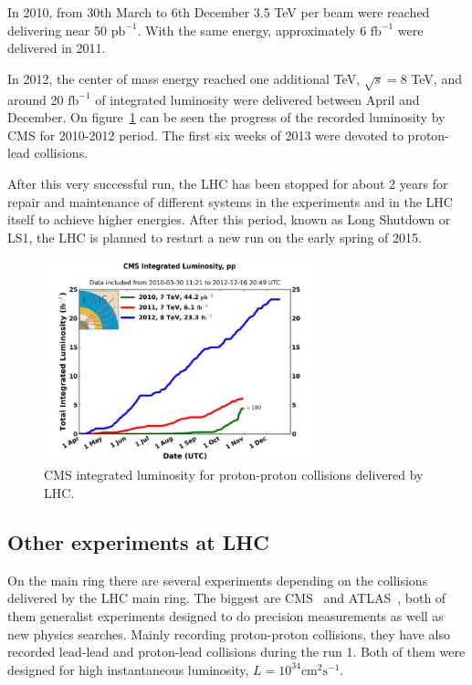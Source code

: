 In 2010, from 30th March to 6th December 3.5 TeV per beam were reached delivering near 50 $\text{pb}^{-1}$. With the same energy, approximately 6 $\text{fb}^{-1}$ were delivered in 2011. 

In 2012, the center of mass energy reached one additional TeV, $\sqrt{s}=8$ TeV, and around 20 $\text{fb}^{-1}$ of integrated luminosity were delivered between April and December. On figure~\ref{fig:CMSlumi} can be seen the progress of the recorded luminosity by CMS for 2010-2012 period. The first six weeks of 2013 were devoted to proton-lead collisions.

After this very successful run, the LHC has been stopped for about 2 years for repair and maintenance of different systems in the experiments and in the LHC itself to achieve higher energies. After this period, known as Long Shutdown  or LS1, the LHC is planned to restart a new run on the early spring of 2015.

\begin{figure}[!Hhtbp]
  \begin{center}
    \includegraphics[width=0.7\textwidth]{figs/cms-int-10to12.jpg}
    \caption{CMS integrated luminosity for proton-proton collisions delivered by LHC. }
    \label{fig:CMSlumi}
  \end{center}
\end{figure}

\subsection{Other experiments at LHC}
\label{sec:expers}

On the main ring there are several experiments depending on the collisions delivered by the LHC main ring. The biggest are CMS~\cite{Bayatian:922757} and ATLAS~\cite{ATLAS:1999}, both of them generalist experiments designed to do precision measurements as well as new physics searches. Mainly recording proton-proton collisions, they have also recorded lead-lead and proton-lead collisions during the run 1. Both of them were designed for high instantaneous luminosity, $L = 10^{34}\text{cm}^{2}\text{s}^{-1}$.

